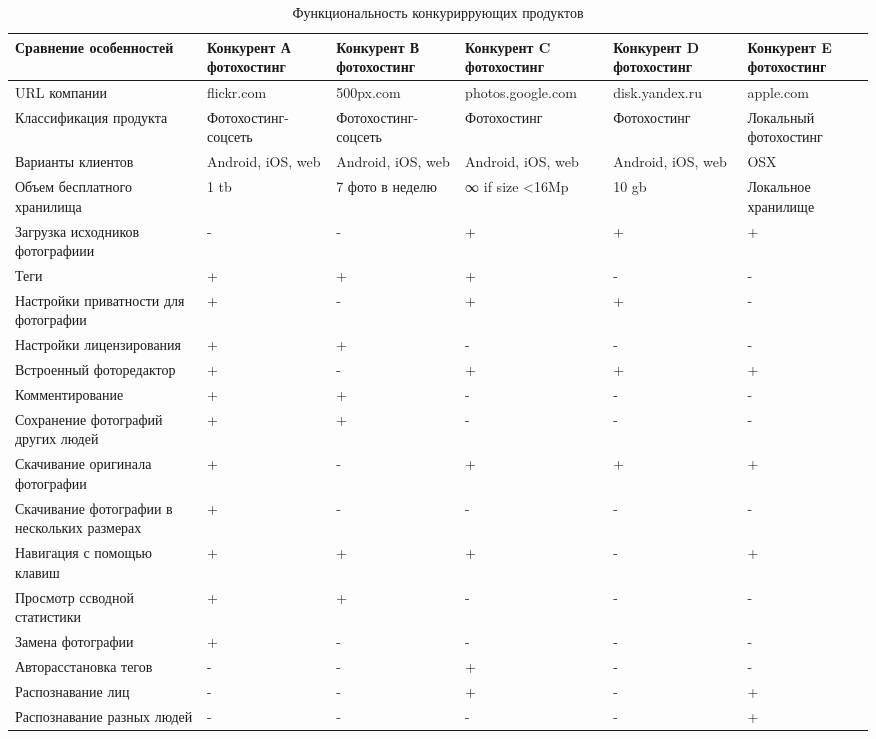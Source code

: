\begin{table}[H]
  \caption{Функциональность конкуриррующих продуктов}\label{comp-table}
  \begin{spacing}{1}
  \small
  \begin{tabular}{|p{3cm}|p{2.5cm}|p{2.5cm}|p{2.5cm}|p{2.5cm}|p{2.5cm}|}
  \hline Сравнение особенностей & Конкурент А фотохостинг & Конкурент В фотохостинг & Конкурент C фотохостинг & Конкурент D фотохостинг & Конкурент E фотохостинг \\ 
  \hline URL компании & flickr.com & 500px.com & photos.google.com & disk.yandex.ru & apple.com \\ 
  \hline Классификация продукта & Фотохостинг-соцсеть & Фотохостинг-соцсеть & Фотохостинг & Фотохостинг & Локальный фотохостинг \\ 
  \hline Варианты клиентов & Android, iOS, web & Android, iOS, web & Android, iOS, web & Android, iOS, web & OSX \\ 
  \hline Объем бесплатного хранилища & 1 tb & 7 фото в неделю & ∞ if size <16Mp & 10 gb & Локальное хранилище \\ 
  \hline Загрузка исходников фотографиии & - & - & + & + & + \\ 
  \hline Теги & + & + & + & - & - \\ 
  \hline Настройки приватности для фотографии & + & - & + & + & - \\ 
  \hline Настройки лицензирования & + & + & - & - & - \\ 
  \hline Встроенный фоторедактор & + & - & + & + & + \\ 
  \hline Комментирование & + & + & - & - & - \\ 
  \hline Сохранение фотографий других людей & + & + & - & - & - \\ 
  \hline Скачивание оригинала фотографии & + & - & + & + & + \\ 
  \hline Скачивание фотографии в нескольких размерах & + & - & - & - & - \\ 
  \hline Навигация с помощью клавиш & + & + & + & - & + \\ 
  \hline Просмотр ссводной статистики & + & + & - & - & - \\ 
  \hline Замена фотографии & + & - & - & - & - \\ 
  \hline Авторасстановка тегов & - & - & + & - & - \\ 
  \hline Распознавание лиц & - & - & + & - & + \\ 
  \hline Распознавание разных людей & - & - & - & - & + \\ 

\end{tabular}
\end{spacing}
\end{table}
